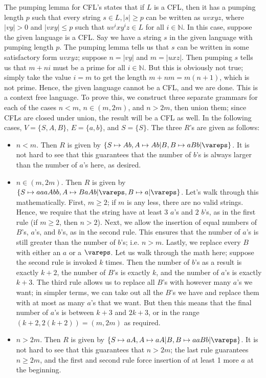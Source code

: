 \documentclass[solution, letterpaper]{cs121}
\begin{document}
\begin{solution}
\subsolution The pumping lemma for CFL's states that if $L$ is a CFL, then it has a pumping length $p$ such that every string $s \in L, |s| \ge p$ can be written as $uvxyz$, where $|vy| > 0$ and $|vxy| \le p$ such that $uv^ixy^iz \in L$ for all $i \in \mathbb{N}$.  In this case, suppose the given language is a CFL.  Say we have a string $s$ in the given language with pumping length $p$.  The pumping lemma tells us that $s$ can be written in some satisfactory form $uvxyz$; suppose $n = |vy|$ and $m = |uxz|$.  Then pumping $s$ tells us that $m + ni$ must be a prime for all $i \in \mathbb{N}$.  But this is obviously not true; simply take the value $i = m$ to get the length $m + nm = m(n+1)$, which is not prime.  Hence, the given language cannot be a CFL, and we are done.
\subsolution This is a context free language.  To prove this, we construct three separate grammars for each of the cases $n < m$, $n \in (m, 2m)$, and $n > 2m$, then union them; since CFLs are closed under union, the result will be a CFL as well.  In the following cases, $V = \{S, A, B\}$, $E = \{a, b\}$, and $S = \{S\}$.  The three $R$'s are given as follows:
\begin{itemize}
	\item $n < m$.  Then $R$ is given by $\{S \mapsto Ab, A \mapsto Ab | B, B \mapsto aBb | \vareps\}$.  It is not hard to see that this guarantees that the number of $b$'s is always larger than the number of $a$'s here, as desired.
	\item $n \in (m, 2m)$.  Then $R$ is given by $\{S \mapsto aaaAbb, A \mapsto BaAb | \vareps, B \mapsto a | \vareps \}$.  Let's walk through this mathematically.  First, $m \ge 2$; if $m$ is any less, there are no valid strings.  Hence, we require that the string have at least $3$ $a$'s and $2$ $b$'s, as in the first rule (if $m \ge 2$, then $n > 2$).  Next, we allow the insertion of equal numbers of $B$'s, $a$'s, and $b$'s, as in the second rule.  This ensures that the number of $a$'s is still greater than the number of $b$'s; i.e. $n > m$.  Lastly, we replace every $B$ with either an $a$ or a $\vareps$.  Let us walk through the math here; suppose the second rule is invoked $k$ times.  Then the number of $b$'s as a result is exactly $k+2$, the number of $B$'s is exactly $k$, and the number of $a$'s is exactly $k + 3$.  The third rule allows us to replace all $B$'s with however many $a$'s we want; in simpler terms, we can take out all the $B$'s we have and replace them with at most as many $a$'s that we want.  But then this means that the final number of $a$'s is between $k+3$ and $2k+3$, or in the range $(k+2, 2(k+2)) = (m, 2m)$ as required.
	\item $n > 2m$.  Then $R$ is given by $\{S \mapsto aA, A \mapsto aA | B, B \mapsto aaBb | \vareps\}$.  It is not hard to see that this guarantees that $n > 2m$; the last rule guarantees $n \ge 2m$, and the first and second rule force insertion of at least 1 more $a$ at the beginning.
\end{itemize}


\end{solution}
\end{document}
